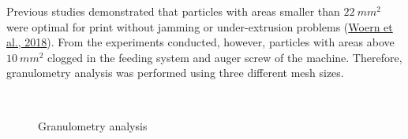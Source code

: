 \documentclass[
  12pt,
]{article}
\begin{document}
Previous studies demonstrated that particles with areas smaller than
\(22~mm^{2}\) were optimal for print without jamming or under-extrusion
problems (\protect\hyperlink{ref-woern2018}{Woern et al., 2018}). From
the experiments conducted, however, particles with areas above
\(10~mm^{2}\) clogged in the feeding system and auger screw of the
machine. Therefore, granulometry analysis was performed using three
different mesh sizes.

\begin{figure}

\begin{minipage}[t]{0.57\linewidth}

{\centering 


\caption{\label{fig-granulometry}Granulometry analysis}

}

\end{minipage}%
%
\begin{minipage}[t]{0.03\linewidth}

{\centering 

~

}

\end{minipage}%
%
\begin{minipage}[t]{0.40\linewidth}


\end{minipage}
\end{figure}
\end{document}

